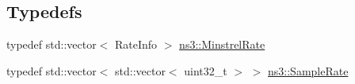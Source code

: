 \subsection*{Typedefs}
\begin{DoxyCompactItemize}
\item 
typedef std\+::vector$<$ Rate\+Info $>$ \hyperlink{namespacens3_a1d11c59469e45dbecea190a2a547b181}{ns3\+::\+Minstrel\+Rate}
\item 
typedef std\+::vector$<$ std\+::vector$<$ uint32\+\_\+t $>$ $>$ \hyperlink{namespacens3_a6f9a56ecdb723c09bd5ab4f3b57a5bb5}{ns3\+::\+Sample\+Rate}
\end{DoxyCompactItemize}
